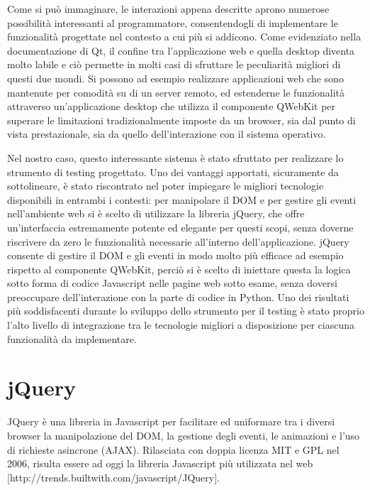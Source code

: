 \documentclass[12pt]{toptesi}
\begin{document}
Come si può immaginare, le interazioni appena descritte aprono numerose possibilità interessanti al programmatore, consentendogli di implementare le funzionalità progettate nel contesto a cui più si addicono. Come evidenziato nella documentazione di Qt, il confine tra l'applicazione web e quella desktop diventa molto labile e ciò permette in molti casi di sfruttare le peculiarità migliori di questi due mondi. Si possono ad esempio realizzare applicazioni web che sono mantenute per comodità su di un server remoto, ed estenderne le funzionalità attraverso un'applicazione desktop che utilizza il componente QWebKit per superare le limitazioni tradizionalmente imposte da un browser, sia dal punto di vista prestazionale, sia da quello dell'interazione con il sistema operativo.

Nel nostro caso, questo interessante sistema è stato sfruttato per realizzare lo strumento di testing progettato. Uno dei vantaggi apportati, sicuramente da sottolineare, è stato riscontrato nel poter impiegare le migliori tecnologie disponibili in entrambi i contesti: per manipolare il DOM e per gestire gli eventi nell'ambiente web si è scelto di utilizzare la libreria jQuery, che offre un'interfaccia estremamente potente ed elegante per questi scopi, senza doverne riscrivere da zero le funzionalità  necessarie all'interno dell'applicazione. jQuery consente di gestire il DOM e gli eventi in modo molto più efficace ad esempio rispetto al componente QWebKit, perciò si è scelto di iniettare questa la logica sotto forma di codice Javascript nelle pagine web sotto esame, senza doversi preoccupare dell'interazione con la parte di codice in Python. Uno dei risultati più soddisfacenti durante lo sviluppo dello strumento per il testing è stato proprio l'alto livello di integrazione tra le tecnologie migliori a disposizione per ciascuna funzionalità da implementare.


\section{jQuery}

JQuery è una libreria in Javascript per facilitare ed uniformare tra i diversi browser la manipolazione del DOM, la gestione degli eventi, le animazioni e l'uso di richieste asincrone (AJAX). Rilasciata con doppia licenza MIT e GPL nel 2006, risulta essere ad oggi la libreria Javascript più utilizzata nel web [http://trends.builtwith.com/javascript/JQuery]. 
\end{document}
